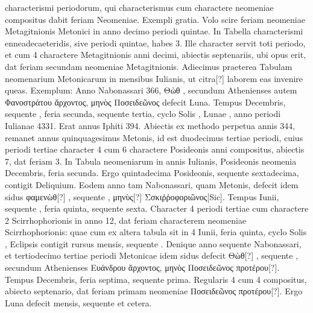 characterismi periodorum, qui characterismus
cum charactere neomeniae compositus dabit feriam
Neomeniae.
%
Exempli gratia.
Volo scire feriam neomeniae Metagitnionis
Metonici in anno decimo periodi quintae.
In Tabella
characterismi enneadecaeteridis, sive periodi quintae, habes
3.
Ille character servit toti periodo, et cum 4 charactere Metagitnionis
anni decimi, abiectis septenariis, ubi opus erit, dat
feriam secundam neomeniae Metagitnionis.
Adiecimus praeterea
Tabulam neomenarium Metonicarum in mensibus Iulianis,
ut citra[?] laborem eas invenire queas.
Exemplum: Anno
Nabonassari 366, \textgreek{Θὼθ },
 secundum Athenienses autem \textgreek{Φανοστράτου
ἄρχοντος, μηνὸς Ποσειδεῶνος} defecit Luna.
Tempus
 Decembris, sequente , feria secunda, sequente
tertia, cyclo Solis , Lunae , anno periodi Iulianae
4331.
Erat annus Iphiti 394.
Abiectis ex methodo perpetua annis
344, remanet annus quinquagesimus Metonis, id est duodecimus
tertiae periodi, cuius periodi tertiae character 4 cum 6 charactere
Posideonis anni  compositus, abiectis 7, dat feriam 3.
%
In Tabula neomeniarum in annis Iulianis, Posideonis neomenia 
Decembris, feria secunda.
Ergo quintadecima Posideonis, sequente
sextadecima, contigit Deliquium.
Eodem anno tam Nabonassari,
quam Metonis, defecit idem
 sidus \textgreek{φαμενὼθ[?] },
 sequente \textgreek{}, \textgreek{μηνὺς[?]}
\textgreek{Σσκιῤῥοφοριῶνος[Sic]}.
Tempus  Iunii, sequente , feria quinta,
sequente sexta.
Character 4 periodi tertiae cum charactere
2 Scirrhophorionis in anno 12, dat feriam  characterem neomeniae
Scirrhophorionis: quae cum ex altera tabula sit in 4 Iunii, feria
quinta, cyclo Solis , Eclipsis contigit rursus  mensis, 
 sequente
.
Denique anno sequente Nabonassari, et tertiodecimo
tertiae periodi Metonicae idem sidus defecit
 \textgreek{Θὼθ[?] }, sequente
\textgreek{}, secundum Athenienses
 \textgreek{Ευάνδρου ἄρχοντος, μηνὸς Ποσειδεῶνος προτέρου[?]}.
Tempus  Decembris, feria septima, sequente prima.
Regularis
4 cum 4 compositus, abiecto septenario, dat feriam primam
neomeniae \textgreek{Ποσειδεῶνος προτέρου[?]}.
Ergo Luna defecit  mensis, sequente
 et cetera.
